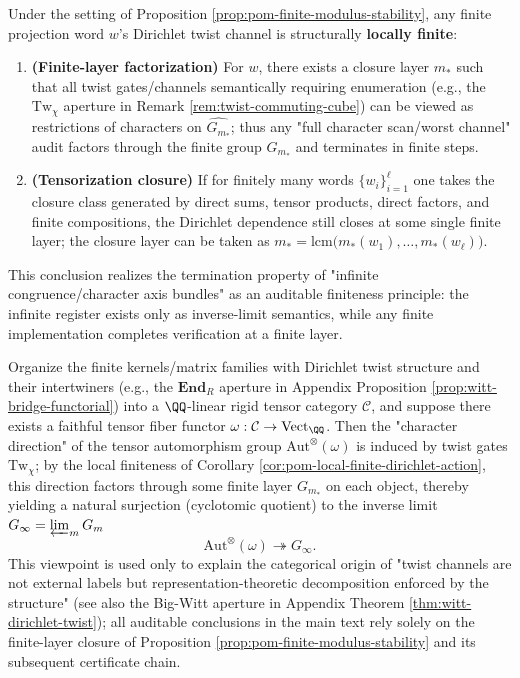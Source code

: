\begin{corollary}\label{cor:pom-local-finite-dirichlet-action}
Under the setting of Proposition \ref{prop:pom-finite-modulus-stability}, any finite projection word \(w\)'s Dirichlet twist channel is structurally \textbf{locally finite}:
\begin{enumerate}
  \item \textbf{(Finite-layer factorization)} For \(w\), there exists a closure layer \(m_\ast\) such that all twist gates/channels semantically requiring enumeration (e.g., the \(\mathrm{Tw}_\chi\) aperture in Remark \ref{rem:twist-commuting-cube}) can be viewed as restrictions of characters on \(\widehat{G_{m_\ast}}\); thus any "full character scan/worst channel" audit factors through the finite group \(G_{m_\ast}\) and terminates in finite steps.
  \item \textbf{(Tensorization closure)} If for finitely many words \(\{w_i\}_{i=1}^{\ell}\) one takes the closure class generated by direct sums, tensor products, direct factors, and finite compositions, the Dirichlet dependence still closes at some single finite layer; the closure layer can be taken as
  \(m_\ast=\mathrm{lcm}\bigl(m_\ast(w_1),\dots,m_\ast(w_\ell)\bigr)\).
\end{enumerate}
This conclusion realizes the termination property of "infinite congruence/character axis bundles" as an auditable finiteness principle: the infinite register exists only as inverse-limit semantics, while any finite implementation completes verification at a finite layer.
\end{corollary}

\begin{remark}\label{rem:pom-cyclotomic-quotient-tannakian}
Organize the finite kernels/matrix families with Dirichlet twist structure and their intertwiners (e.g., the \(\mathbf{End}_R\) aperture in Appendix Proposition \ref{prop:witt-bridge-functorial}) into a \(\QQ\)-linear rigid tensor category \(\mathcal{C}\), and suppose there exists a faithful tensor fiber functor \(\omega:\mathcal{C}\to\mathrm{Vect}_{\QQ}\).
Then the "character direction" of the tensor automorphism group \(\mathrm{Aut}^{\otimes}(\omega)\) is induced by twist gates \(\mathrm{Tw}_\chi\); by the local finiteness of Corollary \ref{cor:pom-local-finite-dirichlet-action}, this direction factors through some finite layer \(G_{m_\ast}\) on each object, thereby yielding a natural surjection (cyclotomic quotient) to the inverse limit
\(
G_\infty=\varprojlim_m G_m
\)
\[
\mathrm{Aut}^{\otimes}(\omega)\twoheadrightarrow G_\infty.
\]
This viewpoint is used only to explain the categorical origin of "twist channels are not external labels but representation-theoretic decomposition enforced by the structure" (see also the Big-Witt aperture in Appendix Theorem \ref{thm:witt-dirichlet-twist}); all auditable conclusions in the main text rely solely on the finite-layer closure of Proposition \ref{prop:pom-finite-modulus-stability} and its subsequent certificate chain.
\end{remark}

